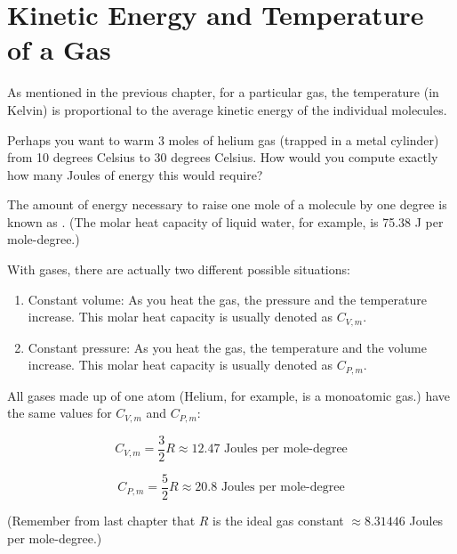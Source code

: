 \chapter{Kinetic Energy and Temperature of a Gas}

As mentioned in the previous chapter, for a particular gas, the temperature (in Kelvin) is proportional to the average kinetic energy of the individual molecules. 

Perhaps you want to warm 3 moles of helium gas (trapped in a metal cylinder) from 10 degrees Celsius to 30 degrees Celsius.  
How would you compute exactly how many Joules of energy this would require?

The amount of energy necessary to raise one mole of a molecule by one degree is known as . 
(The molar heat capacity of liquid water, for example, is 75.38 J per mole-degree.)

With gases, there are actually two different possible situations:
\begin{enumerate}
\item Constant volume: As you heat the gas, the pressure and the temperature increase. This molar heat capacity is usually denoted as $C_{V,m}$. 
\item Constant pressure: As you heat the gas, the temperature and the volume increase. This molar heat capacity is usually denoted as $C_{P, m}$.
\end{enumerate}

All gases made up of one atom (Helium, for example, is a monoatomic gas.) have the same values for $C_{V,m}$ and $C_{P,m}$:

$$C_{V,m} = \frac{3}{2}R \approx 12.47 \text{ Joules per mole-degree}$$

$$C_{P,m} = \frac{5}{2}R \approx 20.8 \text{ Joules per mole-degree}$$

(Remember from last chapter that $R$ is the ideal gas constant $\approx 8.31446$ Joules per mole-degree.)

